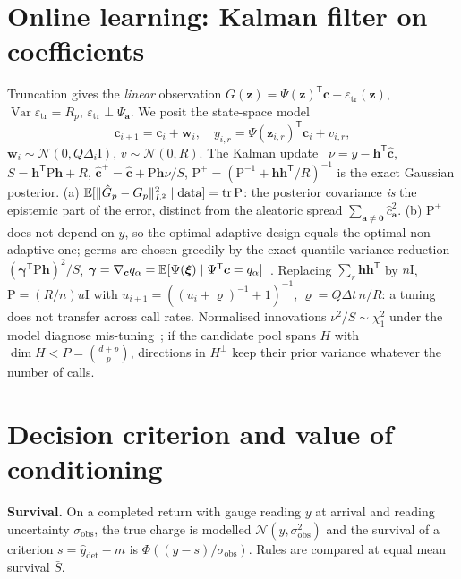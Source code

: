 \documentclass[10pt,twocolumn]{article}
\newcommand{\Germ}{\bm\xi}
\newcommand{\Norm}{\mathcal N}
\newcommand{\Var}{\operatorname{Var}}
\newcommand{\tr}{\operatorname{tr}}
\newcommand{\T}{^{\mathsf T}}
\newcommand{\Id}{\mathrm I}
\newcommand{\dt}{\hat y_{\mathrm{det}}}
\begin{document}
\section{Online learning: Kalman filter on coefficients}
Truncation gives the \emph{linear} observation $G(\bm z)=\Psi(\bm z)\T\bm c+\varepsilon_{\mathrm{tr}}(\bm z)$, $\Var\varepsilon_{\mathrm{tr}}=R_p$, $\varepsilon_{\mathrm{tr}}\perp\Psi_{\bm a}$. We posit the state-space model
\begin{equation}
\bm c_{i+1}=\bm c_i+\bm w_i,\quad y_{i,r}=\Psi(\bm z_{i,r})\T\bm c_i+v_{i,r},
\end{equation}
$\bm w_i\sim\Norm(0,Q\Delta_i\Id)$, $v\sim\Norm(0,R)$. The Kalman update~\cite{kalman1960} $\nu=y-\bm h\T\hat{\bm c}$, $S=\bm h\T\mathrm P\bm h+R$, $\hat{\bm c}^+=\hat{\bm c}+\mathrm P\bm h\nu/S$, $\mathrm P^+=(\mathrm P^{-1}+\bm h\bm h\T/R)^{-1}$ is the exact Gaussian posterior. (a) $\E[\|\hat G_p-G_p\|^2_{L^2}\mid\text{data}]=\tr\mathrm P$: the posterior covariance \emph{is} the epistemic part of the error, distinct from the aleatoric spread $\sum_{\bm a\ne\bm0}\hat c_{\bm a}^2$. (b) $\mathrm P^+$ does not depend on $y$, so the optimal adaptive design equals the optimal non-adaptive one; germs are chosen greedily by the exact quantile-variance reduction $(\bm\gamma\T\mathrm P\bm h)^2/S$, $\bm\gamma=\nabla_{\bm c}q_\alpha=\E[\Psi(\Germ)\mid\Psi\T\bm c=q_\alpha]$~\cite{hong2009}. Replacing $\sum_r\bm h\bm h\T$ by $n\Id$, $\mathrm P=(R/n)u\Id$ with $u_{i+1}=((u_i+\varrho)^{-1}+1)^{-1}$, $\varrho=Q\Delta t\,n/R$: a tuning does not transfer across call rates. Normalised innovations $\nu^2/S\sim\chi^2_1$ under the model diagnose mis-tuning~\cite{andersonmoore1979}; if the candidate pool spans $H$ with $\dim H<P=\binom{d+p}{p}$, directions in $H^\perp$ keep their prior variance whatever the number of calls.

\section{Decision criterion and value of conditioning}
\textbf{Survival.} On a completed return with gauge reading $y$ at arrival and reading uncertainty $\sigma_{\mathrm{obs}}$, the true charge is modelled $\Norm(y,\sigma_{\mathrm{obs}}^2)$ and the survival of a criterion $s=\dt-m$ is $\Phi((y-s)/\sigma_{\mathrm{obs}})$. Rules are compared at equal mean survival $\bar S$.
\end{document}
